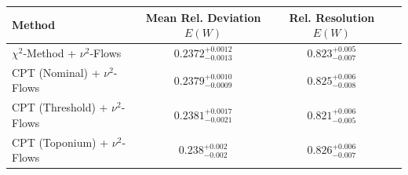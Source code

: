     \begin{tabular}{lccc}
        \toprule
        Method & Mean Rel. Deviation $E(W)$ & Rel. Resolution $E(W)$ \\
        \midrule
        $\chi^2$-Method + $\nu^2$-Flows & $0.2372^{+0.0012}_{-0.0013}$ & $0.823^{+0.005}_{-0.007}$ \\
        CPT (Nominal) + $\nu^2$-Flows & $0.2379^{+0.0010}_{-0.0009}$ & $0.825^{+0.006}_{-0.008}$ \\
        CPT (Threshold) + $\nu^2$-Flows & $0.2381^{+0.0017}_{-0.0021}$ & $0.821^{+0.006}_{-0.005}$ \\
        CPT (Toponium) + $\nu^2$-Flows & $0.238^{+0.002}_{-0.002}$ & $0.826^{+0.006}_{-0.007}$ \\
        \bottomrule
    \end{tabular}
